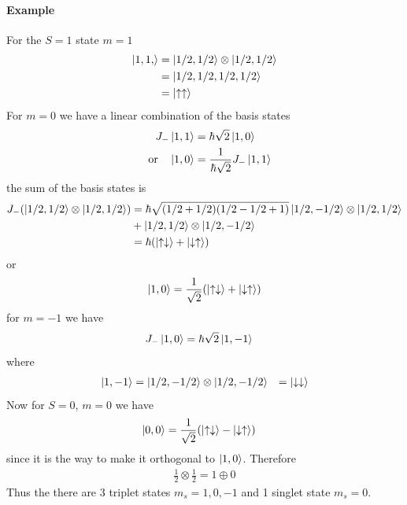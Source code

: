 \documentclass[../main.tex]{subfiles}
\begin{document}
\paragraph{Example} For the $S=1$ state $m = 1$
\begin{align*}
    \ket{1,1,} &= \ket{1/2, 1/2} \otimes \ket{1/2, 1/2} \\
    &= \ket{1/2, 1/2, 1/2, 1/2} \\
    &= \ket{\uparrow \uparrow}
\end{align*}
For $m = 0$ we have a linear combination of the basis states
\begin{align*}
    J_- \ket{1,1} &= \hbar \sqrt{2} \ket{1,0} \\
    \qor \ket{1,0} &= \frac{1}{\hbar \sqrt{2}} J_- \ket{1,1}
\end{align*}
the sum of the basis states is
\begin{align*}
    J_-(\ket{1/2, 1/2} \otimes \ket{1/2, 1/2}) &= \hbar \sqrt{(1/2 + 1/2) (1/2 - 1/2 + 1)} 
        \ket{1/2, -1/2} \otimes \ket{1/2, 1/2} \\
        &+ \ket{1/2, 1/2} \otimes \ket{1/2, -1/2} \\
    &= \hbar(\ket{\uparrow \downarrow} + \ket{\downarrow \uparrow})
\end{align*}
or 
\begin{align*}
    \ket{1,0} = \frac{1}{\sqrt{2}} (\ket{\uparrow \downarrow} + \ket{\downarrow \uparrow})
\end{align*}
for $m = -1$ we have
\begin{align*}
    J_- \ket{1,0} &= \hbar \sqrt{2} \ket{1,-1}
\end{align*}
where
\begin{align*}
    \ket{1,-1} &= \ket{1/2, -1/2} \otimes \ket{1/2, -1/2}
    &= \ket{\downarrow \downarrow}
\end{align*}
Now for $S = 0$, $m = 0$ we have
\begin{align*}
    \ket{0,0} &= \frac{1}{\sqrt{2}} (\ket{\uparrow \downarrow} - \ket{\downarrow \uparrow})
\end{align*}
since it is the way to make it orthogonal to $\ket{1,0}$. Therefore
\begin{align*}
    \frac{1}{2} \otimes \frac{1}{2} = 1 \oplus 0
\end{align*}
Thus the there are 3 triplet states $m_s = 1, 0, -1$ and 1 singlet state $m_s = 0$.
\end{document}
